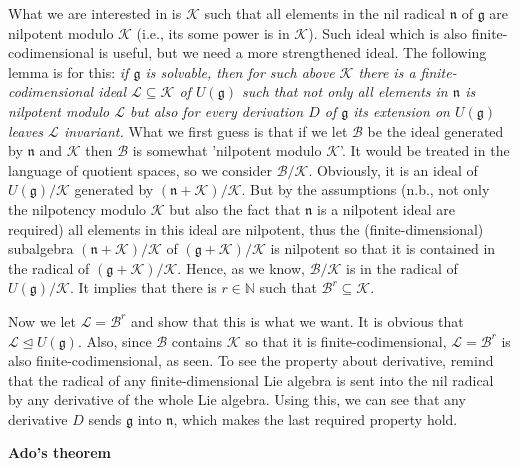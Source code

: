 \documentclass{article}
\newcommand{\NaN}{\mathbb{N}}
\newcommand{\lie}[1]{\mathfrak{#1}}
\begin{document}
What we are interested in is $\mathcal{K}$ such that all elements in the nil radical $\lie{n}$ of $\lie{g}$ are nilpotent modulo $\mathcal{K}$ (i.e., its some power is in $\mathcal{K}$).
Such ideal which is also finite-codimensional is useful, but we need a more strengthened ideal.
The following lemma is for this: \textit{if $\lie{g}$ is solvable, then for such above $\mathcal{K}$ there is a finite-codimensional ideal $\mathcal{L} \subseteq \mathcal{K}$ of $U(\lie{g})$ such that not only all elements in $\lie{n}$ is nilpotent modulo $\mathcal{L}$ but also for every derivation $D$ of $\lie{g}$ its extension on $U(\lie{g})$ leaves $\mathcal{L}$ invariant.}
What we first guess is that if we let $\mathcal{B}$ be the ideal generated by $\lie{n}$ and $\mathcal{K}$ then $\mathcal{B}$ is somewhat 'nilpotent modulo $\mathcal{K}$'.
It would be treated in the language of quotient spaces, so we consider $\mathcal{B}/\mathcal{K}$.
Obviously, it is an ideal of $U(\lie{g})/\mathcal{K}$ generated by $(\lie{n} + \mathcal{K})/\mathcal{K}$.
But by the assumptions (n.b., not only the nilpotency modulo $\mathcal{K}$ but also the fact that $\lie{n}$ is a nilpotent ideal are required) all elements in this ideal are nilpotent, thus the (finite-dimensional) subalgebra $(\lie{n} + \mathcal{K})/\mathcal{K}$ of $(\lie{g} + \mathcal{K})/\mathcal{K}$ is nilpotent so that it is contained in the radical of $(\lie{g} + \mathcal{K})/\mathcal{K}$.
Hence, as we know, $\mathcal{B}/\mathcal{K}$ is in the radical of $U(\lie{g})/\mathcal{K}$.
It implies that there is $r \in \NaN$ such that $\mathcal{B}^r \subseteq \mathcal{K}$.

Now we let $\mathcal{L} = \mathcal{B}^r$ and show that this is what we want.
It is obvious that $\mathcal{L} \trianglelefteq U(\lie{g})$.
Also, since $\mathcal{B}$ contains $\mathcal{K}$ so that it is finite-codimensional, $\mathcal{L} = \mathcal{B}^r$ is also finite-codimensional, as seen.
To see the property about derivative, remind that the radical of any finite-dimensional Lie algebra is sent into the nil radical by any derivative of the whole Lie algebra.
Using this, we can see that any derivative $D$ sends $\lie{g}$ into $\lie{n}$, which makes the last required property hold.

\newpage

\textbf{Ado's theorem}
\end{document}
